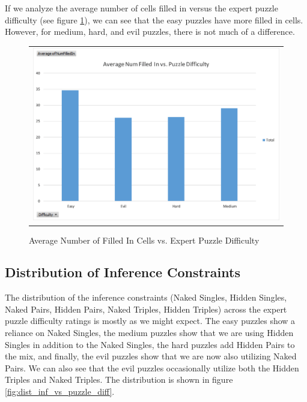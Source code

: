 \documentclass{article}
\begin{document}
If we analyze the average number of cells filled in versus the expert puzzle difficulty (see figure \ref{fig:avg_filled_vs_diff}), we can see that the easy puzzles have more filled in cells. However, for medium, hard, and evil puzzles, there is not much of a difference.\\

\begin{figure}[H]%
	\centering\begin{tabular}{c}
		\includegraphics[scale=0.4]{plots/avg-num-filled-in-vs-puzzle-difficulty.png}\\
	\end{tabular}
	\caption{Average Number of Filled In Cells vs. Expert Puzzle Difficulty}%
	\label{fig:avg_filled_vs_diff}%
\end{figure}

\subsection{Distribution of Inference Constraints}
The distribution of the inference constraints (Naked Singles, Hidden Singles, Naked Pairs, Hidden Pairs, Naked Triples, Hidden Triples) across the expert puzzle difficulty ratings is mostly as we might expect. The easy puzzles show a reliance on Naked Singles, the medium puzzles show that we are using Hidden Singles in addition to the Naked Singles, the hard puzzles add Hidden Pairs to the mix, and finally, the evil puzzles show that we are now also utilizing Naked Pairs. We can also see that the evil puzzles occasionally utilize both the Hidden Triples and Naked Triples. The distribution is shown in figure \ref{fig:dist_inf_vs_puzzle_diff}.\\
\end{document}
